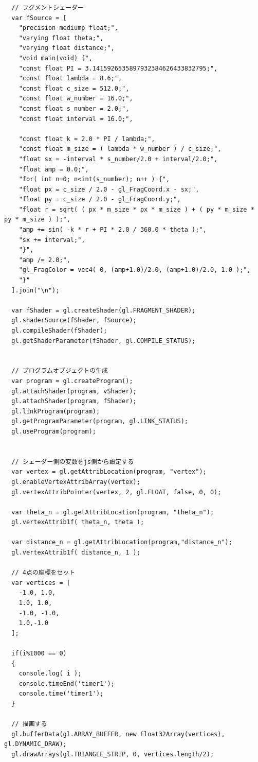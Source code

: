 \documentclass[a4j,12pt]{jsarticle}
\begin{document}
{\begin{lstlisting}
  // フグメントシェーダー
  var fSource = [
    "precision mediump float;",
    "varying float theta;",
    "varying float distance;",
    "void main(void) {",
    "const float PI = 3.1415926535897932384626433832795;",
    "const float lambda = 8.6;",
    "const float c_size = 512.0;",
    "const float w_number = 16.0;",
    "const float s_number = 2.0;",
    "const float interval = 16.0;",

    "const float k = 2.0 * PI / lambda;",
    "const float m_size = ( lambda * w_number ) / c_size;",
    "float sx = -interval * s_number/2.0 + interval/2.0;",
    "float amp = 0.0;",
    "for( int n=0; n<int(s_number); n++ ) {",
    "float px = c_size / 2.0 - gl_FragCoord.x - sx;",
    "float py = c_size / 2.0 - gl_FragCoord.y;",
    "float r = sqrt( ( px * m_size * px * m_size ) + ( py * m_size * py * m_size ) );",
    "amp += sin( -k * r + PI * 2.0 / 360.0 * theta );",
    "sx += interval;",
    "}",
    "amp /= 2.0;",
    "gl_FragColor = vec4( 0, (amp+1.0)/2.0, (amp+1.0)/2.0, 1.0 );",
    "}"
  ].join("\n");

  var fShader = gl.createShader(gl.FRAGMENT_SHADER);
  gl.shaderSource(fShader, fSource);
  gl.compileShader(fShader);
  gl.getShaderParameter(fShader, gl.COMPILE_STATUS);


  // プログラムオブジェクトの生成
  var program = gl.createProgram();
  gl.attachShader(program, vShader);
  gl.attachShader(program, fShader);
  gl.linkProgram(program);
  gl.getProgramParameter(program, gl.LINK_STATUS);
  gl.useProgram(program);


  // シェーダー側の変数をjs側から設定する
  var vertex = gl.getAttribLocation(program, "vertex");
  gl.enableVertexAttribArray(vertex);
  gl.vertexAttribPointer(vertex, 2, gl.FLOAT, false, 0, 0);

  var theta_n = gl.getAttribLocation(program, "theta_n");
  gl.vertexAttrib1f( theta_n, theta );

  var distance_n = gl.getAttribLocation(program,"distance_n");
  gl.vertexAttrib1f( distance_n, 1 );

  // 4点の座標をセット
  var vertices = [
    -1.0, 1.0,
    1.0, 1.0,
    -1.0, -1.0,
    1.0,-1.0
  ];

  if(i%1000 == 0)
  {
    console.log( i );
    console.timeEnd('timer1');
    console.time('timer1');
  }

  // 描画する
  gl.bufferData(gl.ARRAY_BUFFER, new Float32Array(vertices), gl.DYNAMIC_DRAW);
  gl.drawArrays(gl.TRIANGLE_STRIP, 0, vertices.length/2);


\end{lstlisting}}
\end{document}
